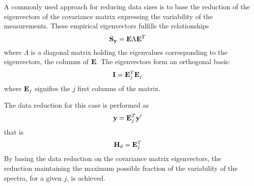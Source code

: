  \label{sec:red:eig}
 
 A commonly used approach for reducing data sizes is to base the
 reduction of the eigenvectors of the covariance matrix expressing the
 variability of the measurements. These empirical eigenvectors
 fulfills the relationships
 \begin{equation}
   \mathbf{S}_{\mathbf{y}} = \mathbf{E}\Lambda\mathbf{E}^T
 \end{equation}
 where $\Lambda$ is a diagonal matrix holding the eigenvalues
 corresponding to the eigenvectors, the columns of $\mathbf{E}$. The
 eigenvectors form an orthogonal basis:
 \begin{equation}
   \mathbf{I} = \mathbf{E}^T_j\mathbf{E}_j
 \end{equation}
 where $\mathbf{E}_j$ signifies the $j$ first columns of the matrix.

 The data reduction for this case is performed as
 \begin{equation}
   \mathbf{y} = \mathbf{E}^T_j \mathbf{y}'
 \end{equation}
 that is
 \begin{equation}
   \mathbf{H}_d = \mathbf{E}^T_j 
 \end{equation}
 By basing the data reduction on the covariance matrix eigenvectors,
 the reduction maintaining the maximum possible fraction of the
 variability of the spectra, for a given $j$, is achieved.






